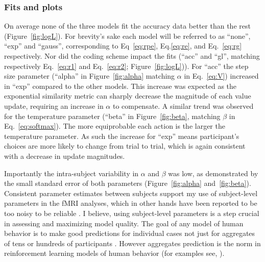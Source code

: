 \documentclass[doc,12pt]{apa}        %
\begin{document}
\subsubsection{Fits and plots}
\label{subsub:fits}
On average none of the three models fit the accuracy data better than the rest (Figure~\ref{fig:logL}).  For brevity's sake each model will be referred to as ``none'', ``exp'' and ``gauss'', corresponding to Eq~\ref{eq:rpe}, Eq.\ref{eq:re}, and Eq.~\ref{eq:rg} respectively.  Nor did the coding scheme impact the fits (``acc'' and ``gl'', matching respectively Eq.~\ref{eq:r1} and Eq.~\ref{eq:r2}; Figure~\ref{fig:logL})).  For ``acc'' the step size parameter (``alpha'' in Figure~\ref{fig:alpha} matching $\alpha$ in Eq.~\ref{eq:V}) increased in ``exp'' compared to the other models.  This increase was expected as the exponential similarity metric can sharply decrease the magnitude of each value update, requiring an increase in $\alpha$ to compensate.  A similar trend was observed for the temperature parameter (``beta'' in Figure~\ref{fig:beta}, matching $\beta$ in Eq.~\ref{eq:softmax}). The more equiprobable each action is the larger the temperature parameter.  As such the increase for ``exp'' means participant's choices are more likely to change from trial to trial, which is again consistent with a decrease in update magnitudes.

Importantly the intra-subject variability in $\alpha$ and $\beta$ was low, as demonstrated by the small standard error of both parameters (Figure~\ref{fig:alpha} and~\ref{fig:beta}).  Consistent parameter estimates between subjects support my use of subject-level parameters in the fMRI analyses, which in other hands have been reported to be too noisy to be reliable \cite{Daw:2011p7995,Seymour:2007p7585,ODoherty:2003p6329}.  I believe, using subject-level parameters is a step crucial in assessing and maximizing model quality. The goal of any model of human behavior is to make good predictions for individual cases not just for aggregates of tens or hundreds of participants \cite{Daw:2007p9346}.  However aggregates prediction is the norm in reinforcement learning models of human behavior (for examples see, ).
\end{document}
